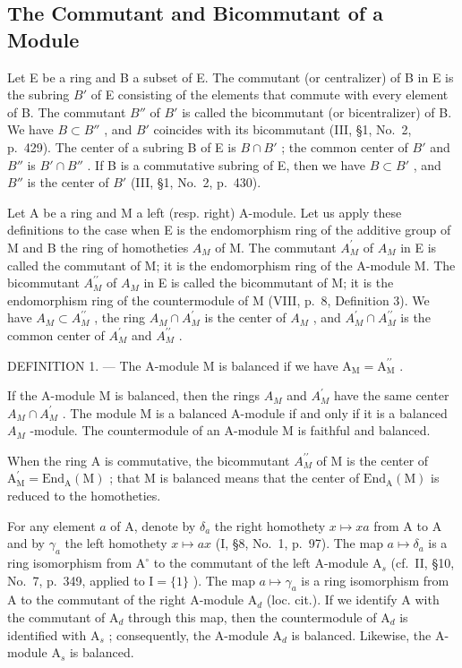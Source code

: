 \subsection{The Commutant and Bicommutant of a Module}

Let E be a ring and B a subset of E. The commutant (or centralizer) of B in E is the subring \(B'\) of E consisting of the elements that commute with every element of B. The commutant \(B''\) of \(B'\) is called the bicommutant (or bicentralizer) of B. We have \(B \subset B''\) , and \(B'\) coincides with its bicommutant (III, §1, No.~2, p.~429). The center of a subring B of E is \(B \cap B'\) ; the common center of \(B'\) and \(B''\) is \(B' \cap B''\) . If B is a commutative subring of E, then we have \(B \subset B'\) , and \(B''\) is the center of \(B'\) (III, §1, No.~2, p.~430).

Let A be a ring and M a left (resp. right) A-module. Let us apply these definitions to the case when E is the endomorphism ring of the additive group of M and B the ring of homotheties \(A_{M}\) of M. The commutant \(A_{M}^{\prime}\) of \(A_{M}\) in E is called the commutant of M; it is the endomorphism ring of the A-module M. The bicommutant \(A_{M}^{\prime\prime}\) of \(A_{M}\) in E is called the bicommutant of M; it is the endomorphism ring of the countermodule of M (VIII, p.~8, Definition 3). We have \(A_{M} \subset A_{M}^{\prime\prime}\) , the ring \(A_{M} \cap A_{M}^{\prime}\) is the center of \(A_{M}\) , and \(A_{M}^{\prime} \cap A_{M}^{\prime\prime}\) is the common center of \(A_{M}^{\prime}\) and \(A_{M}^{\prime\prime}\) .

DEFINITION 1. --- The A-module M is balanced if we have \(\mathrm{A}_{\mathrm{M}} = \mathrm{A}_{\mathrm{M}}^{\prime \prime}\) .

If the A-module M is balanced, then the rings \(A_{M}\) and \(A_{M}^{\prime}\) have the same center \(A_{M} \cap A_{M}^{\prime}\) . The module M is a balanced A-module if and only if it is a balanced \(A_{M}\) -module. The countermodule of an A-module M is faithful and balanced.

When the ring A is commutative, the bicommutant \(A_{M}^{\prime\prime}\) of M is the center of \(\mathrm{A}_{\mathrm{M}}^{\prime}=\mathrm{End}_{\mathrm{A}}(\mathrm{M})\) ; that M is balanced means that the center of \(\mathrm{End}_{\mathrm{A}}(\mathrm{M})\) is reduced to the homotheties.

For any element \(a\) of A, denote by \(\delta_{a}\) the right homothety \(x\mapsto xa\) from A to A and by \(\gamma_{a}\) the left homothety \(x\mapsto ax\) (I, §8, No.~1, p.~97). The map \(a\mapsto \delta_{a}\) is a ring isomorphism from \(\mathrm{A}^{\circ}\) to the commutant of the left A-module \(\mathrm{A}_s\) (cf.~II, §10, No.~7, p.~349, applied to \(\mathrm{I} = \{1\}\) ). The map \(a\mapsto \gamma_{a}\) is a ring isomorphism from A to the commutant of the right A-module \(\mathrm{A}_d\) (loc. cit.). If we identify A with the commutant of \(\mathrm{A}_d\) through this map, then the countermodule of \(\mathrm{A}_d\) is identified with \(\mathrm{A}_s\) ; consequently, the A-module \(\mathrm{A}_d\) is balanced. Likewise, the A-module \(\mathrm{A}_s\) is balanced.

